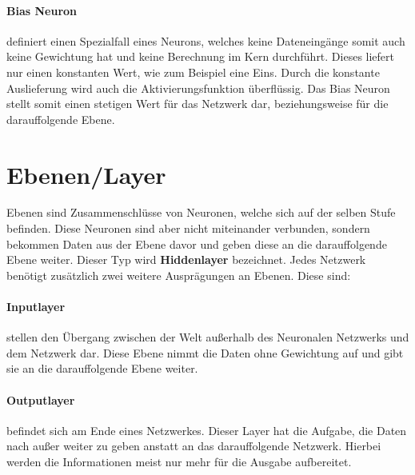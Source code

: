 
\paragraph{Bias Neuron} 
\label{sec:Bias Neuron}

definiert einen Spezialfall eines Neurons, welches keine Dateneingänge somit auch keine Gewichtung hat und keine Berechnung im Kern durchführt. 
Dieses liefert nur einen konstanten Wert, wie zum Beispiel eine Eins. 
Durch die konstante Auslieferung wird auch die Aktivierungsfunktion überflüssig. 
Das Bias Neuron stellt somit einen stetigen Wert für das Netzwerk dar, beziehungsweise für die darauffolgende Ebene.

\section{Ebenen/Layer}
\label{sec:Layer}

Ebenen sind Zusammenschlüsse von Neuronen, welche sich auf der selben Stufe befinden. 
Diese Neuronen sind aber nicht miteinander verbunden, sondern bekommen Daten aus der Ebene davor und geben diese an die darauffolgende Ebene weiter. 
Dieser Typ wird \textbf{Hiddenlayer} bezeichnet. 
Jedes Netzwerk benötigt zusätzlich zwei weitere Ausprägungen an Ebenen. 
Diese sind:

\paragraph{Inputlayer} stellen den Übergang zwischen der Welt außerhalb des Neuronalen Netzwerks und dem Netzwerk dar.
Diese Ebene nimmt die Daten ohne Gewichtung auf und gibt sie an die darauffolgende Ebene weiter. 

\paragraph{Outputlayer} befindet sich am Ende eines Netzwerkes. 
Dieser Layer hat die Aufgabe, die Daten nach außer weiter zu geben anstatt an das darauffolgende Netzwerk. 
Hierbei werden die Informationen meist nur mehr für die Ausgabe aufbereitet. 
\\

